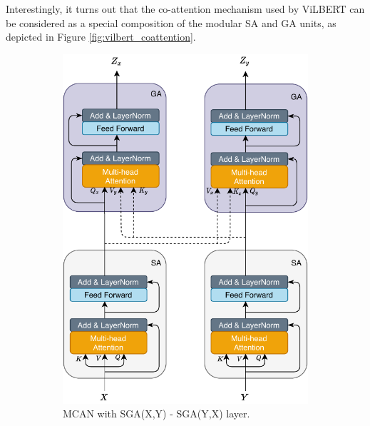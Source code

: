 \documentclass{article}
\begin{document}
Interestingly, it turns out that the co-attention mechanism used by ViLBERT can be considered as a special composition of the modular SA and GA units, as depicted in Figure \ref{fig:vilbert_coattention}.

\begin{figure}[H]
	\centering
	\begin{subfigure}[b]{\textwidth}
	\centering
	\includegraphics[scale=0.7]{attention}
	\caption{MCAN with SGA(X,Y) - SGA(Y,X) layer.}
	\end{subfigure}
	\begin{subfigure}[b]{\textwidth}
	\centering

\end{subfigure}
\end{figure}
\end{document}
